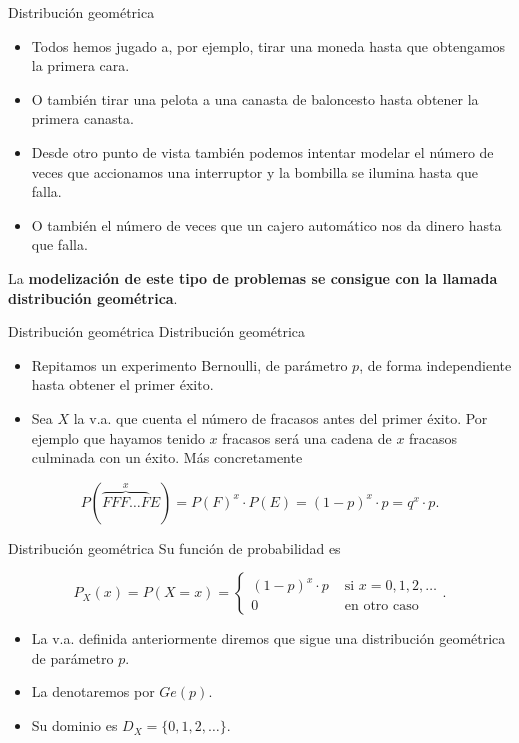 \documentclass[
  ignorenonframetext,
  aspectratio=169]{beamer}
\providecommand{\tightlist}{%
  \setlength{\itemsep}{0pt}\setlength{\parskip}{0pt}}\usepackage{longtable,booktabs,array}
\begin{document}
\begin{frame}{Distribución geométrica}
\protect\hypertarget{distribuciuxf3n-geomuxe9trica-1}{}
\begin{itemize}
\item
  Todos hemos jugado a, por ejemplo, tirar una moneda hasta que
  obtengamos la primera cara.
\item
  O también tirar una pelota a una canasta de baloncesto hasta obtener
  la primera canasta.
\item
  Desde otro punto de vista también podemos intentar modelar el número
  de veces que accionamos una interruptor y la bombilla se ilumina hasta
  que falla.
\item
  O también el número de veces que un cajero automático nos da dinero
  hasta que falla.
\end{itemize}

La \textbf{modelización de este tipo de problemas se consigue con la
llamada distribución geométrica}.
\end{frame}

\begin{frame}{Distribución geométrica}
\protect\hypertarget{distribuciuxf3n-geomuxe9trica-2}{}
Distribución geométrica

\begin{itemize}
\tightlist
\item
  Repitamos un experimento Bernoulli, de parámetro \(p\), de forma
  independiente hasta obtener el primer éxito.
\item
  Sea \(X\) la v.a. que cuenta el número de fracasos antes del primer
  éxito. Por ejemplo que hayamos tenido \(x\) fracasos será una cadena
  de \(x\) fracasos culminada con un éxito. Más concretamente
\end{itemize}

\[P(\overbrace{FFF\ldots F}^{x}E)=P(F)^{x}\cdot P(E)=(1-p)^{x}\cdot p=q^{x}\cdot p.\]
\end{frame}

\begin{frame}{Distribución geométrica}
\protect\hypertarget{distribuciuxf3n-geomuxe9trica-3}{}
Su función de probabilidad es

\[
P_X(x)=P(X=x)=\left\{\begin{array}{ll}
(1-p)^{x}\cdot p & \mbox{ si } x=0,1,2,\ldots\\
0 &\mbox{ en otro caso}
\end{array}\right..
\]

\begin{itemize}
\tightlist
\item
  La v.a. definida anteriormente diremos que sigue una distribución
  geométrica de parámetro \(p\).
\item
  La denotaremos por \(Ge(p)\).
\item
  Su dominio es \(D_X=\{0,1,2,\ldots\}\).
\end{itemize}
\end{frame}
\end{document}
